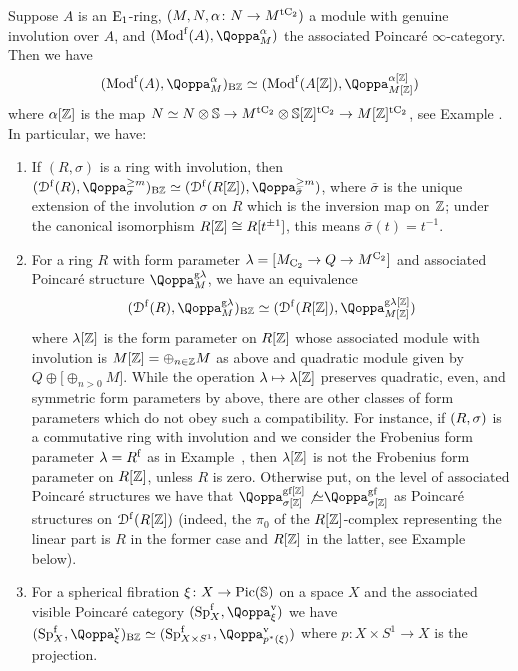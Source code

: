 \begin{example}
\label{example:tensor-BZ}%
Suppose $A$ is an ${\mathrm{E}_{1}}$-ring, $(M,N,\alpha \colon N \to M^{{\mathrm{t}\mathrm{C_2}}})$ a module with genuine involution over $A$, and $(\Mod^\free(A),\QF^\alpha_M)$ the associated Poincar\'e $\infty$-category. Then we have 
\[
(\Mod^\free(A),\QF^\alpha_M)_{\B\ZZ} \simeq (\Mod^\free(A[\ZZ]),\QF^{\alpha[\ZZ]}_{M[\ZZ]})
\]
where $\alpha[\mathbb{Z}]$ is the map $N \simeq N \otimes \mathbb{S} \to M^{{\mathrm{t}\mathrm{C_2}}} \otimes \mathbb{S}[\mathbb{Z}]^{{\mathrm{t}\mathrm{C_2}}} \to M[\mathbb{Z}]^{{\mathrm{t}\mathrm{C_2}}}$, see Example . In particular, we have:
\begin{enumerate}
\item
\label{item:ex-tensor-BZ-genuine-family}%
If $(R,\sigma)$ is a ring with involution, then $(\Dfree(R),\QF^{\geq m}_\sigma)_{\B\ZZ} \simeq (\Dfree(R[\ZZ]),\QF^{\geq m}_{\bar{\sigma}})$, where $\bar{\sigma}$ is the unique extension of the involution $\sigma$ on $R$ which is the inversion map on $\mathbb{Z}$; under the canonical isomorphism $R[\mathbb{Z}] \cong R[t^{\pm 1}]$, this means $\bar{\sigma}(t) = t^{-1}$.
\item 
For a ring $R$ with form parameter $\lambda=[M_{\mathrm{C_2}} \to Q \to M^{\mathrm{C_2}}]$ and associated Poincar\'e structure $\QF^{\g\lambda}_M$, we have an equivalence
\[
(\Dfree(R),\QF_M^{\g\lambda})_{\mathrm{B}\mathbb Z}  \simeq (\Dfree(R[\ZZ]),\QF_{M[\ZZ]}^{\g\lambda[\ZZ]})
\]
where $\lambda[\mathbb{Z}]$ is the form parameter on $R[\mathbb{Z}]$ whose associated module with involution is $M[\mathbb{Z}] = \oplus_{n \in \mathbb{Z}}M$ as above and quadratic module given by $Q \oplus \big[\oplus_{n > 0}M\big]$. While the operation $\lambda \mapsto \lambda[\mathbb{Z}]$ preserves quadratic, even, and symmetric form parameters %
by  above, there are other classes of form parameters which do not obey such a compatibility. For instance, if $(R,\sigma)$ is a commutative ring with involution and we consider the Frobenius form parameter $\lambda = R^{\mathrm{f}}$ as in Example~, then $\lambda[\mathbb{Z}]$ is not the Frobenius form parameter on $R[\mathbb{Z}]$, unless $R$ is zero. Otherwise put, on the level of associated Poincaré structures we have that 
$\QF^{\g\fr[\ZZ]}_{\sig[\ZZ]} \not{\simeq} \QF^{\g\fr}_{\sigma[\ZZ]}$ 
as Poincaré structures on ${\mathcal D}^{\mathrm{f}}(R[\mathbb{Z}])$ %
(indeed, the $\pi_0$ of the $R[\mathbb{Z}]$-complex representing the linear part is $R$ in the former case and $R[\mathbb{Z}]$ in the latter, see Example~ below).
\item For a spherical fibration $\xi \colon X \rightarrow \operatorname{Pic}(\mathbb{S})$ on a space $X$ and the associated visible Poincar\'e category $(\Sp_X^\free,\QF^\vis_\xi)$ we have 
$(\Sp_X^\free,\QF^\vis_\xi)_{\B\ZZ} \simeq (\Sp_{X\times S^1}^\free,\QF^\vis_{p^*(\xi)})$
where $p\colon X \times S^1 \to X$ is the projection.
\end{enumerate}
\end{example}



